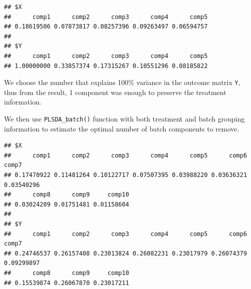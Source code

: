 \documentclass[
]{book}
\newenvironment{Shaded}{\begin{snugshade}}{\end{snugshade}}
\newcommand{\AttributeTok}[1]{\textcolor[rgb]{0.77,0.63,0.00}{#1}}
\newcommand{\CommentTok}[1]{\textcolor[rgb]{0.56,0.35,0.01}{\textit{#1}}}
\newcommand{\DecValTok}[1]{\textcolor[rgb]{0.00,0.00,0.81}{#1}}
\newcommand{\FunctionTok}[1]{\textcolor[rgb]{0.00,0.00,0.00}{#1}}
\newcommand{\NormalTok}[1]{#1}
\newcommand{\OtherTok}[1]{\textcolor[rgb]{0.56,0.35,0.01}{#1}}
\newcommand{\SpecialCharTok}[1]{\textcolor[rgb]{0.00,0.00,0.00}{#1}}
\begin{document}
\begin{verbatim}
## $X
##      comp1      comp2      comp3      comp4      comp5 
## 0.18619506 0.07873817 0.08257396 0.09263497 0.06594757 
## 
## $Y
##      comp1      comp2      comp3      comp4      comp5 
## 1.00000000 0.33857374 0.17315267 0.10551296 0.08185822
\end{verbatim}

We choose the number that explains 100\% variance in the outcome matrix \texttt{Y}, thus from the result, 1 component was enough to preserve the treatment information.

We then use \texttt{PLSDA\_batch()} function with both treatment and batch grouping information to estimate the optimal number of batch components to remove.

\begin{Shaded}
\end{Shaded}

\begin{verbatim}
## $X
##      comp1      comp2      comp3      comp4      comp5      comp6      comp7 
## 0.17470922 0.11481264 0.10122717 0.07507395 0.03988220 0.03636321 0.03540296 
##      comp8      comp9     comp10 
## 0.03024209 0.01751481 0.01158604 
## 
## $Y
##      comp1      comp2      comp3      comp4      comp5      comp6      comp7 
## 0.24746537 0.26157408 0.23013824 0.26082231 0.23017979 0.26074379 0.09299897 
##      comp8      comp9     comp10 
## 0.15539874 0.26067870 0.23017211
\end{verbatim}

\begin{Shaded}
\end{Shaded}
\end{document}

